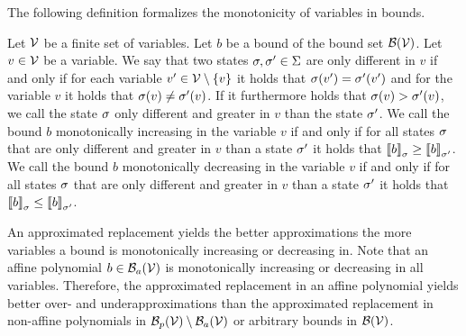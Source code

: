 The following definition formalizes the monotonicity of variables in bounds.

\begin{definition}
  Let $\mathcal{V}$ be a finite set of variables.
  Let $b$ be a bound of the bound set $\mathcal{B}(\mathcal{V})$.
  Let $v \in \mathcal{V}$ be a variable.
  We say that two states $\sigma, \sigma' \in \Sigma$ are only different in $v$ if and only if for each variable $v' \in \mathcal{V} \setminus \lbrace v \rbrace$ it holds that $\sigma(v') = \sigma'(v')$ and for the variable $v$ it holds that $\sigma(v) \neq \sigma'(v)$.
  If it furthermore holds that $\sigma(v) > \sigma'(v)$, we call the state $\sigma$ only different and greater in $v$ than the state $\sigma'$.
  We call the bound $b$ monotonically increasing in the variable $v$ if and only if for all states $\sigma$ that are only different and greater in $v$ than a state $\sigma'$ it holds that $\left\llbracket b \right\rrbracket_{\sigma} \geq \left\llbracket b \right\rrbracket_{\sigma'}$.
  We call the bound $b$ monotonically decreasing in the variable $v$ if and only if for all states $\sigma$ that are only different and greater in $v$ than a state $\sigma'$ it holds that $\left\llbracket b \right\rrbracket_{\sigma} \leq \left\llbracket b \right\rrbracket_{\sigma'}$.
\end{definition}

An approximated replacement yields the better approximations the more variables a bound is monotonically increasing or decreasing in.
Note that an affine polynomial $b \in \mathcal{B}_a(\mathcal{V})$ is monotonically increasing or decreasing in all variables.
Therefore, the approximated replacement in an affine polynomial yields better over- and underapproximations than the approximated replacement in non-affine polynomials in $\mathcal{B}_p(\mathcal{V}) \setminus \mathcal{B}_a(\mathcal{V})$ or arbitrary bounds in $\mathcal{B}(\mathcal{V})$.
